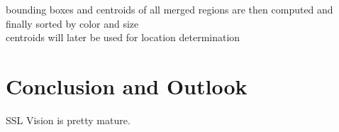 bounding boxes and centroids of all merged regions are then computed and finally
sorted by color and size\\

centroids will later be used for location determination






\clearpage
\section{Conclusion and Outlook}
\label{sec:conclusion}
SSL Vision is pretty mature.




\newpage \begin{appendices} 
\appendixtocon %

\appendixpage %

\subsection*{\listappendixname}
\listofappendices

\newpage

\begin{subappendices}
\renewcommand{\setthesubsection}{\arabic{subsection}:}%

\label{apx:code-template}


\end{subappendices}
\end{appendices}
